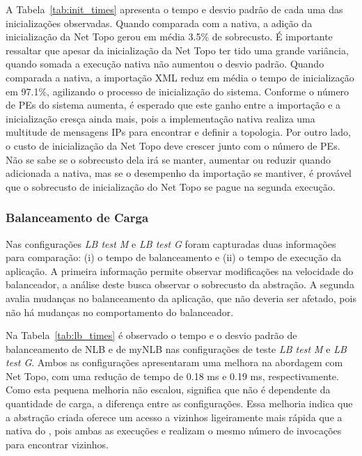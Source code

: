 A Tabela~\ref{tab:init_times} apresenta o tempo e desvio padrão de cada uma das inicializações observadas. 
Quando comparada com a nativa, a adição da inicialização da Net Topo gerou em média 3.5\% de sobrecusto.
É importante ressaltar que apesar da inicialização da Net Topo ter tido uma grande variância, quando somada a execução nativa não aumentou o desvio padrão.
Quando comparada a nativa, a importação XML reduz em média o tempo de inicialização em 97.1\%, agilizando o processo de inicialização do sistema.
Conforme o número de PEs do sistema aumenta, é esperado que este ganho entre a importação e a inicialização cresça ainda mais, pois a implementação nativa realiza uma multitude de mensagens IPs para encontrar e definir a topologia.
Por outro lado, o custo de inicialização da Net Topo deve crescer junto com o número de PEs. Não se sabe se o sobrecusto dela irá se manter, aumentar ou reduzir quando adicionada a nativa, mas se o desempenho da importação se mantiver, é provável que o sobrecusto de inicialização do Net Topo se pague na segunda execução.

\subsubsection{Balanceamento de Carga}

Nas configurações \textit{LB test M} e \textit{LB test G} foram capturadas duas informações para comparação: (i) o tempo de balanceamento e (ii) o tempo de execução da aplicação.
A primeira informação permite observar modificações na velocidade do balanceador, a análise deste busca observar o sobrecusto da abstração.
A segunda avalia mudanças no balanceamento da aplicação, que não deveria ser afetado, pois não há mudanças no comportamento do balanceador.

Na Tabela~\ref{tab:lb_times} é observado o tempo e o desvio padrão de balanceamento de NLB e de myNLB nas configurações de teste \textit{LB test M} e \textit{LB test G}.
Ambos as configurações apresentaram uma melhora na abordagem com Net Topo, com uma redução de tempo de 0.18 ms e 0.19 ms, respectivamente. Como esta pequena melhoria não escalou, significa que não é dependente da quantidade de carga, a diferença entre as configurações.
Essa melhoria indica que a abstração criada oferece um acesso a vizinhos ligeiramente mais rápida que a nativa do \charm, pois ambas as execuções e realizam o mesmo número de invocações para encontrar vizinhos.

